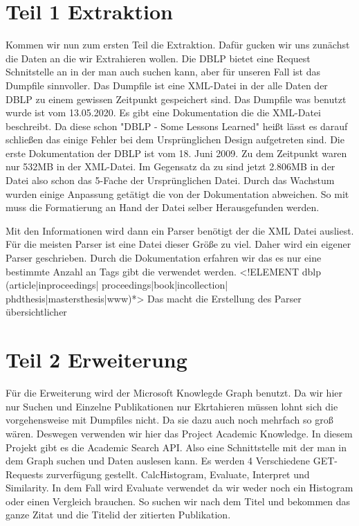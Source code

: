 \documentclass[a4paper,12pt]{article}
\begin{document}
	\section{Teil 1 Extraktion}
	Kommen wir nun zum ersten Teil die Extraktion. Dafür gucken wir uns zunächst die Daten an die wir Extrahieren wollen. Die DBLP bietet eine Request Schnitstelle an in der man auch suchen kann, aber für unseren Fall ist das Dumpfile sinnvoller. Das Dumpfile ist eine XML-Datei in der alle Daten der DBLP zu einem gewissen Zeitpunkt gespeichert sind. Das Dumpfile was benutzt wurde ist vom 13.05.2020. Es gibt eine Dokumentation die die XML-Datei beschreibt. Da diese schon "DBLP - Some Lessons Learned" heißt lässt es darauf schließen das einige Fehler bei dem Ursprünglichen Design aufgetreten sind. Die erste Dokumentation der DBLP ist vom 18. Juni 2009. Zu dem Zeitpunkt waren nur 532MB in der XML-Datei. Im Gegensatz da zu sind jetzt 2.806MB in der Datei also schon das 5-Fache der Ursprünglichen Datei. Durch das Wachstum wurden einige Anpassung getätigt die von der Dokumentation abweichen. So mit muss die Formatierung an Hand der Datei selber Herausgefunden werden. 
	
	Mit den Informationen wird dann ein Parser benötigt der die XML Datei ausliest. Für die meisten Parser ist eine Datei dieser Größe zu viel. Daher wird ein eigener Parser geschrieben. Durch die Dokumentation erfahren wir das es nur eine bestimmte Anzahl an Tags gibt die verwendet werden.
	<!ELEMENT dblp (article|inproceedings|
	 proceedings|book|incollection|
	 phdthesis|mastersthesis|www)*>
	Das macht die Erstellung des Parser übersichtlicher 
	
	\section{Teil 2 Erweiterung}
	Für die Erweiterung wird der Microsoft Knowlegde Graph benutzt. Da wir hier nur Suchen und Einzelne Publikationen nur Ekrtahieren müssen lohnt sich die vorgehensweise mit Dumpfiles nicht. Da sie dazu auch noch mehrfach so groß wären. Deswegen verwenden wir hier das Project Academic Knowledge. In diesem Projekt gibt es die Academic Search API. Also eine Schnittstelle mit der man in dem Graph suchen und Daten auslesen kann. Es werden 4 Verschiedene GET-Requests zurverfügung gestellt. CalcHistogram, Evaluate, Interpret und Similarity. In dem Fall wird Evaluate verwendet da wir weder noch ein Histogram oder einen Vergleich brauchen. So suchen wir nach dem Titel und bekommen das ganze Zitat und die Titelid der zitierten Publikation.
	
\end{document}
